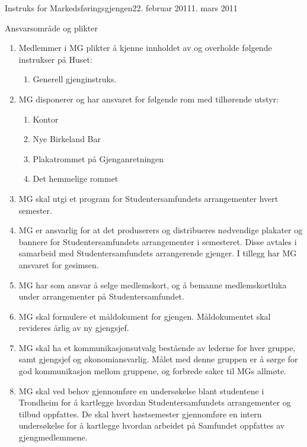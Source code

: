 \begin{instruks}{Instruks for Markedsføringsgjengen}{22. februar 2011}{1. mars 2011 }
    \begin{instruksledd}{Ansvarsområde og plikter}
        \begin{enumerate}   
            \item  Medlemmer i MG plikter å kjenne innholdet av og overholde følgende instrukser på
                Huset:
                \begin{enumerate}
                    \item Generell gjenginstruks.
                \end{enumerate}
            \item MG disponerer og har ansvaret for følgende rom med tilhørende utstyr:
                \begin{enumerate}
                    \item Kontor
                    \item Nye Birkeland Bar
                    \item Plakatrommet på Gjenganretningen
                    \item Det hemmelige rommet
                \end{enumerate}
            \item MG skal utgi et program for
                Studentersamfundets arrangementer hvert semester.
            \item MG er ansvarlig for at det
                produserers og distribueres nødvendige plakater og bannere for
                Studentersamfundets
                arrangementer i semesteret. Disse avtales i samarbeid med Studentersamfundets
                arrangerende
                gjenger. I tillegg har MG ansvaret for gesimsen.
            \item MG har som ansvar å selge medlemskort, og å
                bemanne medlemskortluka under arrangementer på Studentersamfundet.
            \item MG skal formulere et måldokument for
                gjengen. Måldokumentet skal revideres årlig av ny gjengsjef.
            \item MG skal ha et kommunikasjonsutvalg
                bestående av lederne for hver gruppe, samt gjengsjef og
                økonomiansvarlig. Målet med denne gruppen er å sørge for god kommunikasjon mellom gruppene, og
                forbrede saker til MGs allmøte.
            \item MG skal ved behov gjennomføre en
                undersøkelse blant studentene i Trondheim for å kartlegge
                hvordan Studentersamfundets arrangementer og tilbud oppfattes. De skal hvert høstsemester
                gjennomføre en
                intern undersøkelse for å kartlegge hvordan arbeidet på Samfundet oppfattes av gjengmedlemmene.
        \end{enumerate}
    \end{instruksledd}


\end{instruks}
